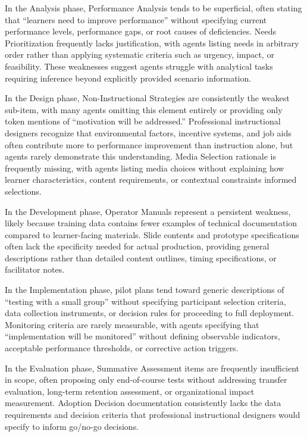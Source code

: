 In the Analysis phase, Performance Analysis tends to be superficial, often stating that ``learners need to improve performance'' without specifying current performance levels, performance gaps, or root causes of deficiencies. Needs Prioritization frequently lacks justification, with agents listing needs in arbitrary order rather than applying systematic criteria such as urgency, impact, or feasibility. These weaknesses suggest agents struggle with analytical tasks requiring inference beyond explicitly provided scenario information.

In the Design phase, Non-Instructional Strategies are consistently the weakest sub-item, with many agents omitting this element entirely or providing only token mentions of ``motivation will be addressed.'' Professional instructional designers recognize that environmental factors, incentive systems, and job aids often contribute more to performance improvement than instruction alone, but agents rarely demonstrate this understanding. Media Selection rationale is frequently missing, with agents listing media choices without explaining how learner characteristics, content requirements, or contextual constraints informed selections.

In the Development phase, Operator Manuals represent a persistent weakness, likely because training data contains fewer examples of technical documentation compared to learner-facing materials. Slide contents and prototype specifications often lack the specificity needed for actual production, providing general descriptions rather than detailed content outlines, timing specifications, or facilitator notes.

In the Implementation phase, pilot plans tend toward generic descriptions of ``testing with a small group'' without specifying participant selection criteria, data collection instruments, or decision rules for proceeding to full deployment. Monitoring criteria are rarely measurable, with agents specifying that ``implementation will be monitored'' without defining observable indicators, acceptable performance thresholds, or corrective action triggers.

In the Evaluation phase, Summative Assessment items are frequently insufficient in scope, often proposing only end-of-course tests without addressing transfer evaluation, long-term retention assessment, or organizational impact measurement. Adoption Decision documentation consistently lacks the data requirements and decision criteria that professional instructional designers would specify to inform go/no-go decisions.

